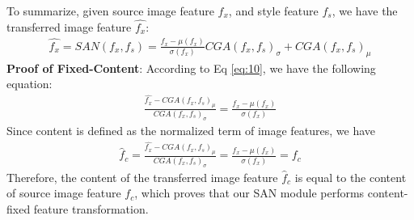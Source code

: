 \documentclass[runningheads]{llncs}
\begin{document}
To summarize, given source image feature $f_x$, and style feature $f_s$, we have the transferred image feature $\hat{f_x}$:
\begin{align}
    \label{eq:10}
      \hat{f_x} = SAN(f_x,f_s) = \frac{f_x-\mu(f_x)}{\sigma(f_x)} CGA(f_x,f_s)_{\sigma} + CGA(f_x,f_s)_{\mu}
\end{align}
\noindent\textbf{Proof of Fixed-Content}: 
According to Eq \ref{eq:10}, we have the following equation:
\begin{align}
      \frac{\hat{f_x}-CGA(f_x,f_s)_{\mu}}{CGA(f_x,f_s)_{\sigma}} = \frac{f_x-\mu(f_x)}{\sigma(f_x)}
\end{align}
Since content is defined as the normalized term of image features, we have
\begin{align}
      \hat{f}_{c} = \frac{\hat{f_x}-CGA(f_x,f_s)_{\mu}}{CGA(f_x,f_s)_{\sigma}} = \frac{f_x-\mu(f_x)}{\sigma(f_x)} = f_{c}
\end{align}
Therefore, the content of the transferred image feature $\hat{f}_c$ is equal to the content of source image feature $f_c$, which proves that our SAN module performs content-fixed feature transformation.
\end{document}
